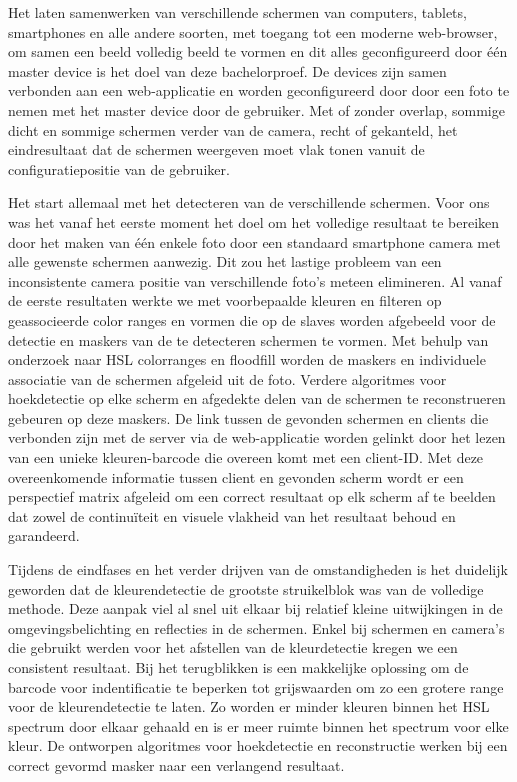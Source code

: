Het laten samenwerken van verschillende schermen van computers, tablets, smartphones en alle andere soorten, met toegang tot een moderne web-browser, om samen een beeld volledig beeld te vormen en dit alles geconfigureerd door één master device is het doel van deze bachelorproef. De devices zijn samen verbonden aan een web-applicatie en worden geconfigureerd door door een foto te nemen met het master device door de gebruiker. Met of zonder overlap, sommige dicht en sommige schermen verder van de camera, recht of gekanteld, het eindresultaat dat de schermen weergeven moet vlak tonen vanuit de configuratiepositie van de gebruiker.

Het start allemaal met het detecteren van de verschillende schermen. Voor ons was het vanaf het eerste moment het doel om het volledige resultaat te bereiken door het maken van één enkele foto door een standaard smartphone camera met alle gewenste schermen aanwezig. Dit zou het lastige probleem van een inconsistente camera positie van verschillende foto’s meteen elimineren. Al vanaf de eerste resultaten werkte we met voorbepaalde kleuren en filteren op geassocieerde color ranges en vormen die op de slaves worden afgebeeld voor de detectie en maskers van de te detecteren schermen te vormen. Met behulp van onderzoek naar HSL colorranges en floodfill worden de maskers en individuele associatie van de schermen afgeleid uit de foto. Verdere algoritmes voor hoekdetectie op elke scherm en afgedekte delen van de schermen te reconstrueren gebeuren op deze maskers. De link tussen de gevonden schermen en clients die verbonden zijn met de server via de web-applicatie worden gelinkt door het lezen van een unieke kleuren-barcode die overeen komt met een client-ID. Met deze overeenkomende informatie tussen client en gevonden scherm wordt er een perspectief matrix afgeleid om een correct resultaat op elk scherm af te beelden dat zowel de continuïteit en visuele vlakheid van het resultaat behoud en garandeerd.

Tijdens de eindfases en het verder drijven van de omstandigheden is het duidelijk geworden dat de kleurendetectie de grootste struikelblok was van de volledige methode. Deze aanpak viel al snel uit elkaar bij relatief kleine uitwijkingen in de omgevingsbelichting en reflecties in de schermen. Enkel bij schermen en camera’s die gebruikt werden voor het afstellen van de kleurdetectie kregen we een consistent resultaat. Bij het terugblikken is een makkelijke oplossing om de barcode voor indentificatie te beperken tot grijswaarden om zo een grotere range voor de kleurendetectie te laten. Zo worden er minder kleuren binnen het HSL spectrum door elkaar gehaald en is er meer ruimte binnen het spectrum voor elke kleur. De ontworpen algoritmes voor hoekdetectie en reconstructie werken bij een correct gevormd masker naar een verlangend resultaat.
